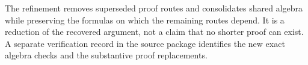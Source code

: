The refinement removes superseded proof routes and consolidates
shared algebra while preserving the formulas on which the remaining
routes depend.  It is a reduction of the recovered argument, not a
claim that no shorter proof can exist.  A separate verification record
in the source package identifies the new exact algebra checks and
the substantive proof replacements.
